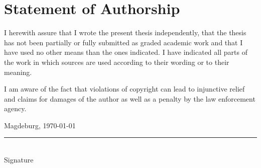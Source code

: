 \documentclass[
  12pt,
  a4paper,
  printlength,
  bibliography=totoc,
  chapterprefix,
  headings=openright,
  numbers=endperiod,
  parskip=half,
  twoside
]{scrreprt}
\begin{document}
\section*{Statement of Authorship}

I herewith assure that I wrote the present thesis independently, that the thesis has not been partially or fully submitted as graded academic work and that I have used no other means than the ones indicated.
I have indicated all parts of the work in which sources are used according to their wording or to their meaning.

I am aware of the fact that violations of copyright can lead to injunctive relief and claims for damages of the author as well as a penalty by the law enforcement agency.

\bigskip

Magdeburg, \today

\bigskip
\bigskip

\rule{0.5\textwidth}{0.5pt}\\
\hspace*{0.25em}Signature
\end{document}
